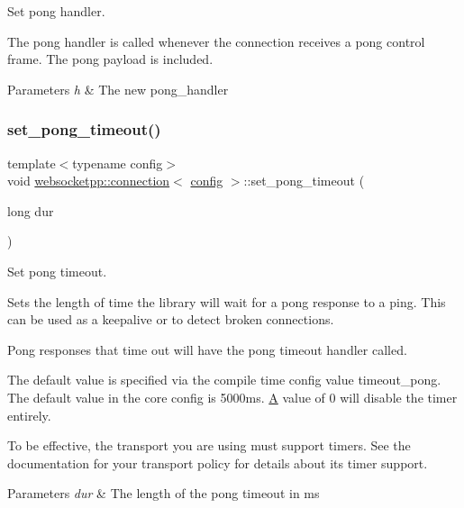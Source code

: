 Set pong handler. 

The pong handler is called whenever the connection receives a pong control frame. The pong payload is included.


\begin{DoxyParams}{Parameters}
{\em h} & The new pong\+\_\+handler \\
\hline
\end{DoxyParams}
\mbox{\label{classwebsocketpp_1_1connection_ab9a905ac6a4f0f8546011b8f8a531563}} 
\subsubsection{\texorpdfstring{set\+\_\+pong\+\_\+timeout()}{set\_pong\_timeout()}}
{\footnotesize\ttfamily template$<$typename config$>$ \\
void \mbox{\hyperlink{classwebsocketpp_1_1connection}{websocketpp\+::connection}}$<$ \mbox{\hyperlink{classconfig}{config}} $>$\+::set\+\_\+pong\+\_\+timeout (\begin{DoxyParamCaption}\item[{long}]{dur }\end{DoxyParamCaption})\hspace{0.3cm}{\ttfamily [inline]}}



Set pong timeout. 

Sets the length of time the library will wait for a pong response to a ping. This can be used as a keepalive or to detect broken connections.

Pong responses that time out will have the pong timeout handler called.

The default value is specified via the compile time config value \textquotesingle{}timeout\+\_\+pong\textquotesingle{}. The default value in the core config is 5000ms. \mbox{\hyperlink{struct_a}{A}} value of 0 will disable the timer entirely.

To be effective, the transport you are using must support timers. See the documentation for your transport policy for details about its timer support.


\begin{DoxyParams}{Parameters}
{\em dur} & The length of the pong timeout in ms \\
\hline
\end{DoxyParams}
\mbox{\label{classwebsocketpp_1_1connection_a6baa576fffc7af7685cf75894d634fb7}} 
